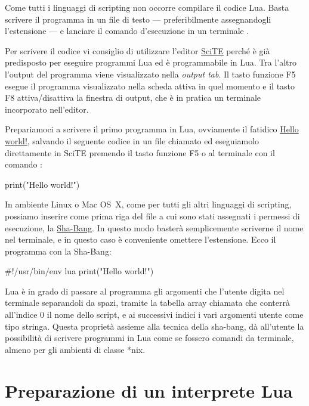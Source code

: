 


Come tutti i linguaggi di scripting non occorre compilare il codice Lua. Basta
scrivere il programma in un file di testo --- preferibilmente assegnandogli
l'estensione  --- e lanciare il comando d'esecuzione in un terminale
.

Per scrivere il codice vi consiglio di utilizzare l'editor
\href{http://www.scintilla.org/SciTE.html}{SciTE} perché è già predisposto per
eseguire programmi Lua ed è programmabile in Lua. Tra l'altro l'output del
programma viene visualizzato nella \emph{output tab}. Il tasto funzione F5
esegue il programma visualizzato nella scheda attiva in quel momento e il tasto
F8 attiva/disattiva la finestra di output, che è in pratica un terminale
incorporato nell'editor.

Prepariamoci a scrivere il primo programma in Lua, ovviamente il fatidico
\href{http://en.wikipedia.org/wiki/%22Hello,_world!%22_program"}{Hello world!},
salvando il seguente codice in un file chiamato  ed eseguiamolo
direttamente in SciTE premendo il tasto funzione F5 o al terminale con il
comando :
\begin{linesrun}
print("Hello world!")
\end{linesrun}

In ambiente Linux o Mac OS~X, come per tutti gli altri linguaggi di scripting,
possiamo inserire come prima riga del file a cui sono stati assegnati i permessi
di esecuzione, la
\href{http://en.wikipedia.org/wiki/Shebang_%28Unix%29}{Sha-Bang}. In questo modo
basterà semplicemente scriverne il nome nel terminale, e in questo caso è
conveniente omettere l'estensione. Ecco il programma con la Sha-Bang:
\begin{lines}
#!/usr/bin/env lua
print("Hello world!")
\end{lines}

Lua è in grado di passare al programma gli argomenti che l'utente digita nel
terminale separandoli da spazi, tramite la tabella array chiamata  che
conterrà all'indice 0 il nome dello script, e ai successivi indici i vari
argomenti utente come tipo stringa. Questa proprietà assieme alla tecnica della
sha-bang, dà all'utente la possibilità di scrivere programmi in Lua come se
fossero comandi da terminale, almeno per gli ambienti di classe *nix.

\chapter{Preparazione di un interprete Lua}

